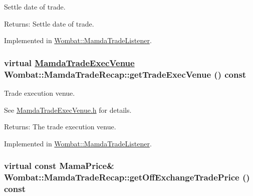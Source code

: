 Settle date of trade. 

\begin{Desc}
\item[Returns:]Settle date of trade. \end{Desc}


Implemented in \hyperlink{classWombat_1_1MamdaTradeListener_2f94098f4eefc746ec8447cf31a190a7}{Wombat::Mamda\-Trade\-Listener}.\hypertarget{classWombat_1_1MamdaTradeRecap_6df7435306c01b0d0828d9a524fbe0bd}{
\subsubsection[getTradeExecVenue]{\setlength{\rightskip}{0pt plus 5cm}virtual \hyperlink{namespaceWombat_daf4c098665070a9e45bf835bad3548a}{Mamda\-Trade\-Exec\-Venue} Wombat::Mamda\-Trade\-Recap::get\-Trade\-Exec\-Venue () const}}
\label{classWombat_1_1MamdaTradeRecap_6df7435306c01b0d0828d9a524fbe0bd}


Trade execution venue. 

See \hyperlink{MamdaTradeExecVenue_8h}{Mamda\-Trade\-Exec\-Venue.h} for details.

\begin{Desc}
\item[Returns:]The trade execution venue. \end{Desc}


Implemented in \hyperlink{classWombat_1_1MamdaTradeListener_12aa826e64effedd9e64fcdc95ce8217}{Wombat::Mamda\-Trade\-Listener}.\hypertarget{classWombat_1_1MamdaTradeRecap_4441eab85326326aa600c783a33a55bd}{
\subsubsection[getOffExchangeTradePrice]{\setlength{\rightskip}{0pt plus 5cm}virtual const Mama\-Price\& Wombat::Mamda\-Trade\-Recap::get\-Off\-Exchange\-Trade\-Price () const}}
\label{classWombat_1_1MamdaTradeRecap_4441eab85326326aa600c783a33a55bd}



